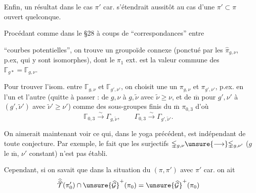Enfin, un résultat dans le cas $\pi'$  car. s'étendrait aussitôt au cas d'une $\pi'\subset\pi$ ouvert quelconque.

Procédant  comme dans le \S 28 à coups de ``correspondances''  entre


``courbes potentielles'', on trouve un groupoïde connexe (ponctué par les $\widehat{\pi}_{g,\nu}$, p.ex, \deleted{\unsure{)}} qui y sont  isomorphes), dont le $\pi_1$ ext. est la valeur commune des $\mathbb{\Gamma}_{g*}=\mathbb{\Gamma}_{g,\nu}$.

Pour trouver  l'isom.  entre $\mathbb{\Gamma}_{g,\nu}$ et $\mathbb{\Gamma}_{g',\nu'}$, on choisit une   un $\pi_{g,\nu}$ et $\pi_{g',\nu'}$, p.ex. en   l'un et l'autre (quitte à passer : de $g,\nu$ à $g,\widetilde{\nu}$ avec $\widetilde{\nu}\geq\nu$, et de $\overline{\mathrm m}$ pour $g',\nu'$ à $(g',\widetilde{\nu}')$ avec $\widetilde{\nu}'\geq\nu'$) comme des sous-groupes finis du $\overline{\mathrm m}$ $\pi_{0,3}$  d'où
\[
\mathbb{\Gamma}_{0,3}\xrightarrow{\sim}\Gamma_{g,\widetilde{\nu}},
\qquad
\Gamma_{0,3}\xrightarrow{\sim}\Gamma_{g',\widetilde{\nu}'}.
\]

On aimerait maintenant voir ce qui, dans le yoga précédent, est indépendant de toute conjecture. Par exemple, le fait que les  surjectifs  $\mathbb{\Gamma}_{g,\nu}\unsure{\longrightarrow}\mathbb{\Gamma}_{g,\nu'}$ ($g$ le $\overline{\mathrm m}$, $\nu'$ constant) n'est pas établi.

Cependant, si on savait que dans la situation du $(\pi,\pi')$ avec $\pi'$  car. on ait
\[
\widehat{\widehat{\mathcal T}}(\pi'_0)\cap
\unsure{\widehat{\mathcal G}}^{+}(\pi_0)
=
\unsure{\widehat{\mathcal G}}^{+}(\pi_0)
\]


